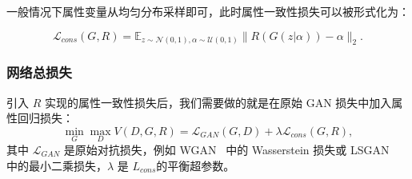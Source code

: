 

一般情况下属性变量从均匀分布采样即可，此时属性一致性损失可以被形式化为：

\begin{equation}
     \mathcal{L}_{cons}(G, R)  =  \mathbb{E}_{z \sim \mathcal{N}(0,1), \alpha \sim \mathcal{U}(0,1)}\|R(G(z|\alpha)) - \alpha\|_2.
\end{equation}

\subsubsection{网络总损失}
引入 $R$ 实现的属性一致性损失后，我们需要做的就是在原始 GAN 损失中加入属性回归损失：
\begin{equation}
     \min _{G} \max _{D} V(D, G, R) = \mathcal{L}_{GAN}(G, D) + \lambda \mathcal{L}_{cons}(G, R),
     \label{overall}
\end{equation}
其中 $\mathcal{L}_{GAN}$ 是原始对抗损失，例如 WGAN~\cite{wgan} 中的 Wasserstein 损失或 LSGAN~\cite{lsgan} 中的最小二乘损失，$\lambda$ 是 $L_{cons}$的平衡超参数。

